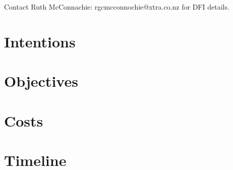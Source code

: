 \documentclass{article}
\begin{document}
Contact Ruth McConnachie: rgcmcconnochie@xtra.co.nz for DFI details.

\section{Intentions}

\section{Objectives}

\section{Costs}

\section{Timeline}
\end{document}
